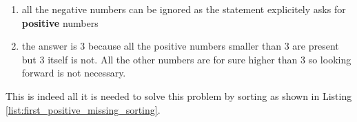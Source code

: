 \begin{enumerate}
	\item all the negative numbers can be ignored as the statement explicitely asks for \textbf{positive} numbers
	\item the answer is $3$ because all the positive numbers smaller than $3$ are present but $3$ itself is not. All the other numbers are for sure higher than $3$ so looking forward is not necessary.
\end{enumerate}

This is indeed all it is needed to solve this problem by sorting as shown in Listing \ref{list:first_positive_missing_sorting}.



